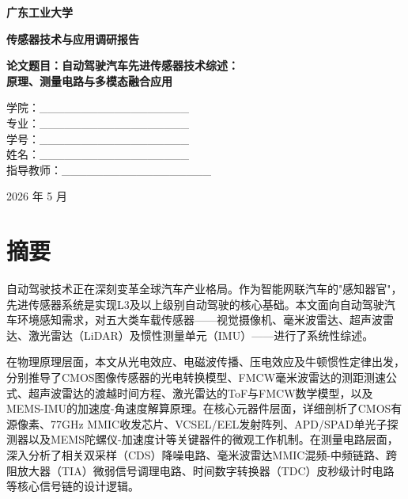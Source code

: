 \documentclass[12pt,a4paper,openany,UTF8]{ctexbook}
\begin{document}
\thispagestyle{empty}
\begin{center}
\vspace*{2cm}

\heiti\fontsize{22pt}{24pt}\bfseries 广东工业大学

\vspace{2cm}

\heiti\fontsize{16pt}{18pt}\bfseries 传感器技术与应用调研报告

\vspace{1.5cm}

\heiti\fontsize{15pt}{17pt}\bfseries
论文题目：自动驾驶汽车先进传感器技术综述：\\
原理、测量电路与多模态融合应用

\vspace{1.5cm}

\fontsize{14pt}{16pt}\selectfont
学院：\_\_\_\_\_\_\_\_\_\_\_\_\_\_\_\_\_\_ \\
专业：\_\_\_\_\_\_\_\_\_\_\_\_\_\_\_\_\_\_ \\
学号：\_\_\_\_\_\_\_\_\_\_\_\_\_\_\_\_\_\_ \\
姓名：\_\_\_\_\_\_\_\_\_\_\_\_\_\_\_\_\_\_ \\
指导教师：\_\_\_\_\_\_\_\_\_\_\_\_\_\_\_\_\_\_

\vspace{2.5cm}

2026 年 5 月
\end{center}
\clearpage

\setcounter{page}{1}

\chapter*{\heiti 摘\quad 要}

自动驾驶技术正在深刻变革全球汽车产业格局。作为智能网联汽车的"感知器官"，先进传感器系统是实现L3及以上级别自动驾驶的核心基础。本文面向自动驾驶汽车环境感知需求，对五大类车载传感器——视觉摄像机、毫米波雷达、超声波雷达、激光雷达（LiDAR）及惯性测量单元（IMU）——进行了系统性综述。

在物理原理层面，本文从光电效应、电磁波传播、压电效应及牛顿惯性定律出发，分别推导了CMOS图像传感器的光电转换模型、FMCW毫米波雷达的测距测速公式、超声波雷达的渡越时间方程、激光雷达的ToF与FMCW数学模型，以及MEMS-IMU的加速度-角速度解算原理。在核心元器件层面，详细剖析了CMOS有源像素、77GHz MMIC收发芯片、VCSEL/EEL发射阵列、APD/SPAD单光子探测器以及MEMS陀螺仪-加速度计等关键器件的微观工作机制。在测量电路层面，深入分析了相关双采样（CDS）降噪电路、毫米波雷达MMIC混频-中频链路、跨阻放大器（TIA）微弱信号调理电路、时间数字转换器（TDC）皮秒级计时电路等核心信号链的设计逻辑。
\end{document}
